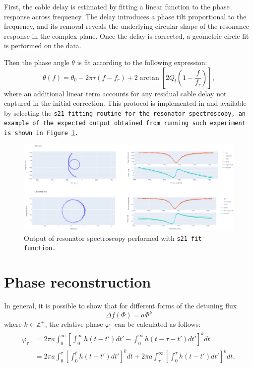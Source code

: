First, the cable delay is estimated by fitting a linear function to the phase response across frequency. 
The delay introduces a phase tilt proportional to the frequency, and its removal reveals the underlying circular shape of the resonance response in the complex plane. 
Once the delay is corrected, a geometric circle fit is performed on the data.

Then the phase angle $\theta$ is fit according to the following expression:
\begin{equation}
    \theta(f) = \theta_0 - 2\pi \tau (f - f_r) + 2 \arctan \left[ 2 Q_l \left( 1 - \frac{f}{f_r} \right) \right],
\end{equation}
where an additional linear term accounts for any residual cable delay not captured in the initial correction. 
This protocol is implemented in \Qibocal and available by selecting the \tt{s21} fitting routine for the resonator spectroscopy, an example of the expected output obtained from running such experiment is shown in Figure \ref{fig:res_s21}.

\begin{figure}[ht!]
    \centering
    \includegraphics[width=\textwidth]{figures/png/s21.png}
    \caption{Output of resonator spectroscopy performed with \tt{s21} fit function.}
    \label{fig:res_s21}
\end{figure}

\chapter{Phase reconstruction}
\label{app:AppendixB}

In general, it is possible to show that for different forms of the detuning flux 
\begin{equation}\label{eq:det_flux}
    \Delta f(\Phi) = a\Phi^k
\end{equation}
where $k \in \mathbb{Z}^+$, the relative phase $\varphi_{\tau}$ can be calculated as follows:
\begin{align}
    \varphi_\tau &= 2\pi a \int_{0}^{\infty} \left[ \int_{0}^{\infty} h(t - t') dt' - \int_{0}^{\infty} h(t - \tau - t') dt' \right]^k dt \\
    &= 2\pi a \int_{0}^{\tau} \left[ \int_{0}^{t} h(t - t') dt' \right]^k dt + 2\pi a \int_{\tau}^{\infty} \left[ \int_{0}^{\tau} h(t - t') dt' \right]^k dt,
\end{align}

